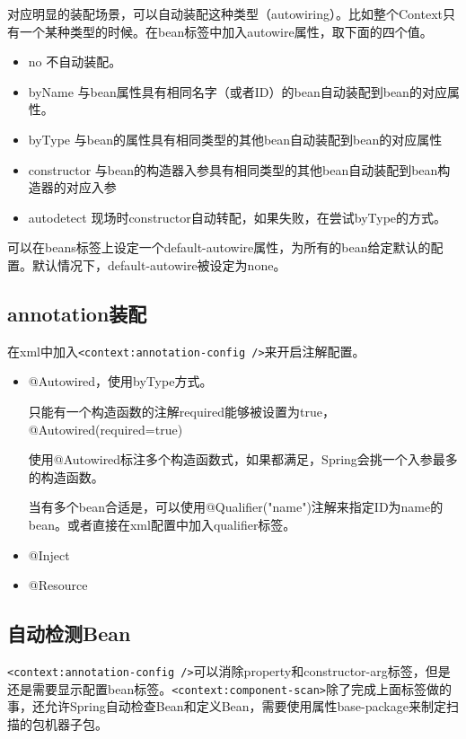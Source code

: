 对应明显的装配场景，可以自动装配这种类型（autowiring）。比如整个Context只有一个某种类型的时候。在bean标签中加入autowire属性，取下面的四个值。

\begin{itemize}
\item no 不自动装配。
\item byName 与bean属性具有相同名字（或者ID）的bean自动装配到bean的对应属性。
\item byType 与bean的属性具有相同类型的其他bean自动装配到bean的对应属性
\item constructor 与bean的构造器入参具有相同类型的其他bean自动装配到bean构造器的对应入参
\item autodetect 现场时constructor自动转配，如果失败，在尝试byType的方式。
\end{itemize}

可以在beans标签上设定一个default-autowire属性，为所有的bean给定默认的配置。默认情况下，default-autowire被设定为none。


\subsection{annotation装配}

在xml中加入\lstinline$<context:annotation-config />$来开启注解配置。

\begin{itemize}
\item @Autowired，使用byType方式。

只能有一个构造函数的注解required能够被设置为true，@Autowired(required=true)

使用@Autowired标注多个构造函数式，如果都满足，Spring会挑一个入参最多的构造函数。

当有多个bean合适是，可以使用@Qualifier("name")注解来指定ID为name的bean。或者直接在xml配置中加入qualifier标签。


\item @Inject
\item @Resource
\end{itemize}


\subsection{自动检测Bean}

\lstinline$<context:annotation-config />$可以消除property和constructor-arg标签，但是还是需要显示配置bean标签。\lstinline$<context:component-scan>$除了完成上面标签做的事，还允许Spring自动检查Bean和定义Bean，需要使用属性base-package来制定扫描的包机器子包。

